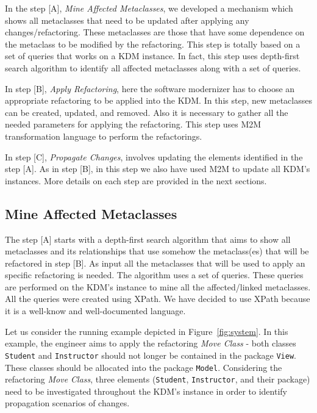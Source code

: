 In the step [A], \textit{Mine Affected Metaclasses}, we developed a mechanism which shows all metaclasses that need to be updated after applying any changes/refactoring. These metaclasses are those that have some dependence on the metaclass to be modified by the refactoring. This step is totally based on a set of queries that works on a KDM instance. In fact, this step uses depth-first search algorithm to identify all affected metaclasses along with a set of queries.

In step [B], \textit{Apply Refactoring}, here the software modernizer has to choose an appropriate refactoring to be applied into the KDM. In this step, new metaclasses can be created, updated, and removed. Also it is necessary to gather all the needed parameters for applying the refactoring. %
This step uses M2M transformation language to perform the refactorings.

In step [C], \textit{Propagate Changes}, involves updating the elements identified in the step [A].  As in step [B], in this step we also have used M2M to update all KDM's instances. 
More details on each step are provided in the next sections.

\subsection{Mine Affected Metaclasses} %
\label{sub:mine_affected_metaclasses}

The step [A] starts with a depth-first search algorithm that aims to show all metaclasses and its relationships that use somehow the metaclass(es) that will be refactored in step [B]. As input all the metaclasses that will be used to apply an specific refactoring is needed. The algorithm uses a set of queries. These queries are performed on the KDM's instance to mine all the affected/linked metaclasses. All the queries were created using XPath. We have decided to use XPath because it is a well-know and well-documented language. 

Let us consider the running example depicted in Figure~\ref{fig:system}. In this example, the engineer aims to apply the refactoring \textit{Move Class} - both classes \texttt{Student} and \texttt{Instructor} should not longer be contained in the package \texttt{View}. These classes should be allocated into the package \texttt{Model}. Considering the refactoring \textit{Move Class}, three elements (\texttt{Student}, \texttt{Instructor}, and their package) need to be investigated throughout the KDM's instance in order to identify propagation scenarios of changes. 

